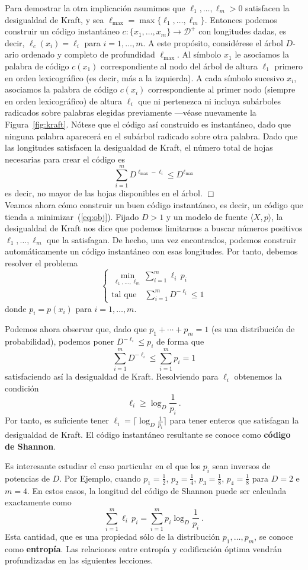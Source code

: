 \documentclass[11pt]{article}
\newenvironment{proof}{{\textsc{Dimostrazione.}\ }}{\hfill$\Box$\\[2mm]}
\newcommand{\scD}{\mathcal{D}}
\newcommand{\lmax}{\ell_{\textrm{max}}}
\newcommand{\dt}{\displaystyle}
\begin{document}
\begin{proof}
Para demostrar la otra implicación asumimos que $\ell_1,\dots,\ell_m > 0$ satisfacen la desigualdad de Kraft, y sea $\lmax = \max\{\ell_1,\dots,\ell_m\}$. Entonces podemos construir un código instantáneo $c : \{x_1,\dots,x_m\} \to \scD^+$ con longitudes dadas, es decir, $\ell_c(x_i) = \ell_i$ para $i=1,\dots,m$. A este propósito, considérese el árbol $D$-ario ordenado y completo de profundidad $\lmax$. Al símbolo $x_1$ le asociamos la palabra de código $c(x_1)$ correspondiente al nodo del árbol de altura $\ell_1$ primero en orden lexicográfico (es decir, más a la izquierda). A cada símbolo sucesivo $x_i$, asociamos la palabra de código $c(x_i)$ correspondiente al primer nodo (siempre en orden lexicográfico) de altura $\ell_i$ que ni pertenezca ni incluya subárboles radicados sobre palabras elegidas previamente ---véase nuevamente la Figura~\ref{fig:kraft}. Nótese que el código así construido es instantáneo, dado que ninguna palabra aparecerá en el subárbol radicado sobre otra palabra. Dado que las longitudes satisfacen la desigualdad de Kraft, el número total de hojas necesarias para crear el código es
\[
    \sum_{i=1}^m D^{\lmax-\ell_i} \le D^{\lmax}
\]
es decir, no mayor de las hojas disponibles en el árbol.
\end{proof}
Veamos ahora cómo construir un buen código instantáneo, es decir, un código que tienda a minimizar~(\ref{eq:obj}). Fijado $D > 1$ y un modelo de fuente $\langle X,p \rangle$, la desigualdad de Kraft nos dice que podemos limitarnos a buscar números positivos $\ell_1,\dots,\ell_m$ que la satisfagan. De hecho, una vez encontrados, podemos construir automáticamente un código instantáneo con esas longitudes. Por tanto, debemos resolver el problema
\[
    \left\{ \begin{array}{l}
       {\dt \min_{\ell_1,\dots,\ell_m} \sum_{i=1}^m \ell_i\,p_i }
    \\[2mm]
        \text{tal que} {\dt \quad \sum_{i=1}^m D^{-\ell_i} \le 1 }
    \end{array} \right.
\]
donde $p_i = p(x_i)$ para $i=1,\dots,m$.
 
Podemos ahora observar que, dado que $p_1+\cdots+p_m = 1$ (es una distribución de probabilidad), podemos poner $D^{-\ell_i} \le p_i$ de forma que
\[
    \sum_{i=1}^m D^{-\ell_i} \le \sum_{i=1}^m p_i = 1
\]
satisfaciendo así la desigualdad de Kraft. Resolviendo para $\ell_i$ obtenemos la condición
\[
    \ell_i \ge \log_D\frac{1}{p_i}~.
\]
Por tanto, es suficiente tener $\ell_i = \bigl\lceil \log_D\tfrac{1}{p_i} \bigr\rceil$ para tener enteros que satisfagan la desigualdad de Kraft. El código instantáneo resultante se conoce como \textbf{código de Shannon}.

Es interesante estudiar el caso particular en el que los $p_i$ sean inversos de potencias de $D$. Por Ejemplo, cuando $p_1 = \tfrac{1}{2}$, $p_2 = \tfrac{1}{4}$, $p_3 = \tfrac{1}{8}$, $p_4 = \tfrac{1}{8}$ para $D=2$ e $m=4$. En estos casos, la longitud del código de Shannon puede ser calculada exactamente como
\[
    \sum_{i=1}^m \ell_i\,p_i = \sum_{i=1}^m p_i\log_D\frac{1}{p_i}~.
\]
Esta cantidad, que es una propiedad sólo de la distribución $p_1,\dots,p_m$, se conoce como \textbf{entropía}. Las relaciones entre entropía y codificación óptima vendrán profundizadas en las siguientes lecciones.
\end{document}
